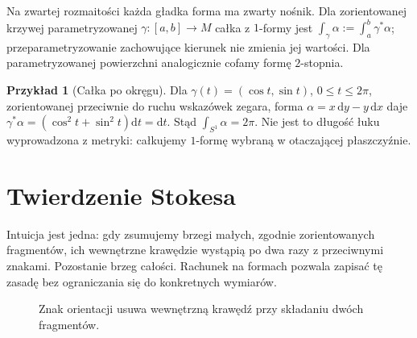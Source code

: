 \documentclass[11pt,a4paper,oneside]{report}
\newcommand{\dd}{\mathrm d}
\theoremstyle{plain}
\theoremstyle{definition}
\newtheorem{przyklad}[twierdzenie]{Przykład}
\theoremstyle{remark}
\begin{document}
Na zwartej rozmaitości każda gładka forma ma zwarty
nośnik. Dla zorientowanej krzywej parametryzowanej
$\gamma:[a,b]\to M$ całka z $1$-formy jest
$\int_\gamma\alpha:=\int_a^b\gamma^*\alpha$;
przeparametryzowanie zachowujące kierunek nie zmienia
jej wartości. Dla parametryzowanej powierzchni
analogicznie cofamy formę $2$-stopnia.

\begin{przyklad}[Całka po okręgu]
Dla $\gamma(t)=(\cos t,\sin t)$, $0\leq t\leq2\pi$,
zorientowanej przeciwnie do ruchu wskazówek zegara,
forma $\alpha=x\,\dd y-y\,\dd x$ daje
$\gamma^*\alpha=(\cos^2t+\sin^2t)\dd t=\dd t$.
Stąd $\int_{S^1}\alpha=2\pi$.
Nie jest to długość łuku wyprowadzona z metryki:
całkujemy $1$-formę wybraną w otaczającej płaszczyźnie.
\end{przyklad}

\section{Twierdzenie Stokesa}
\label{sec:formy-stokes}

Intuicja jest jedna: gdy zsumujemy brzegi
małych, zgodnie zorientowanych fragmentów,
ich wewnętrzne krawędzie wystąpią po dwa razy
z przeciwnymi znakami. Pozostanie brzeg całości.
Rachunek na formach pozwala zapisać tę zasadę
bez ograniczania się do konkretnych wymiarów.

\begin{figure}[!htbp]
\centering
{}
\caption{Znak orientacji usuwa wewnętrzną krawędź
przy składaniu dwóch fragmentów.}
\label{fig:stokes-anulowanie}
\end{figure}
\end{document}
